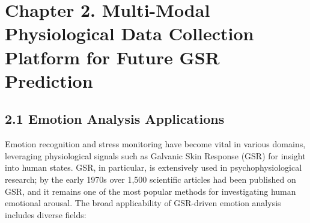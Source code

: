 \documentclass[11pt,a4paper]{report}
\begin{document}
\label{chap:2}

\chapter{Chapter 2. Multi-Modal Physiological Data Collection Platform for Future GSR Prediction}

\section{2.1 Emotion Analysis Applications}

Emotion recognition and stress monitoring have become vital in various
domains, leveraging physiological signals such as Galvanic Skin Response
(GSR) for insight into human states. GSR, in particular, is extensively
used in psychophysiological research; by the early 1970s over 1,500
scientific articles had been published on GSR, and it remains one of the
most popular methods for investigating human emotional
arousal\cite{Boucsein2012}.
The broad applicability of GSR-driven emotion analysis includes diverse
fields:
\end{document}
